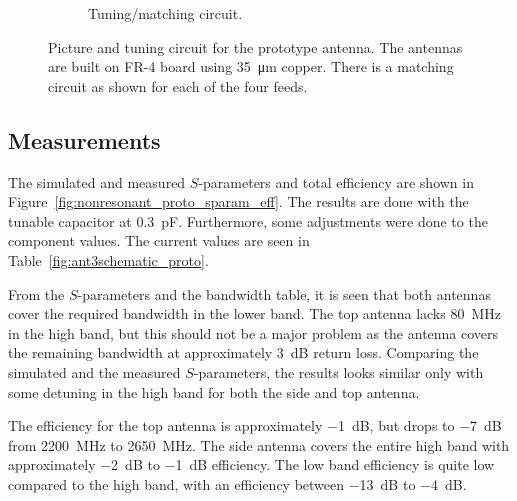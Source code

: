 \begin{figure}[htbp]
\begin{subfigure}[b]{0.49\linewidth}
        \caption{Tuning/matching circuit.}
        \label{fig:ant3schematic}
    \end{subfigure}
    \caption{Picture and tuning circuit for the prototype antenna. The antennas are built on FR-4 board using \SI{35}{\micro\meter} copper. There is a matching circuit as shown for each of the four feeds.}
    \label{fig:ant3techschem_proto}
\end{figure}


\subsection{Measurements} %
The simulated and measured $S$-parameters and total efficiency are shown in Figure~\ref{fig:nonresonant_proto_sparam_eff}. The results are done with the tunable capacitor at \SI{0.3}{pF}. Furthermore, some adjustments were done to the component values. The current values are seen in Table~\ref{fig:ant3schematic_proto}. 

From the $S$-parameters and the bandwidth table, it is seen that both antennas cover the required bandwidth in the lower band. The top antenna lacks \SI{80}{MHz} in the high band, but this should not be a major problem as the antenna covers the remaining bandwidth at approximately \SI{3}{dB} return loss. Comparing the simulated and the measured $S$-parameters, the results looks similar only with some detuning in the high band for both the side and top antenna.

The efficiency for the top antenna is approximately \SI{-1}{dB}, but drops to \SI{-7}{dB} from \SI{2200}{MHz} to \SI{2650}{MHz}. The side antenna covers the entire high band with approximately \SI{-2}{dB} to \SI{-1}{dB} efficiency. The low band efficiency is quite low compared to the high band, with an efficiency between \SI{-13}{dB} to \SI{-4}{dB}.

